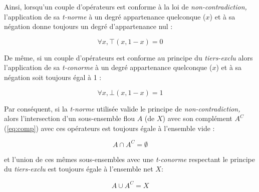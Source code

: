Ainsi, lorsqu'un couple d'opérateurs est conforme à la loi de
\emph{non-contradiction,} l’application de sa \emph{t-norme} à un
degré appartenance quelconque (\(x\)) et à sa négation donne toujours
un degré d'appartenance nul :

\begin{equation}
  \forall x, ⊤(x,1-x) = 0
\end{equation}

De même, si un couple d'opérateurs est conforme au principe du
\emph{tiers-exclu} alors l’application de sa \emph{t-conorme} à un
degré appartenance quelconque (\(x\))  et à sa négation soit
toujours égal à 1 :

\begin{equation}
  \forall x, ⊥(x,1-x) = 1
\end{equation}

Par conséquent, si la \emph{t-norme} utilisée valide le principe de
\emph{non-contradiction,} alors l'intersection d'un sous-ensemble flou
\(A\) (de \(X\)) avec son complément \(A^C\) (\autoref{eq:comp}) avec
ces opérateurs est toujours égale à l'ensemble vide :

\begin{equation}
  A \cap A^C = \emptyset
\end{equation}

et l'union de ces mêmes sous-ensembles avec une \emph{t-conorme}
respectant le principe du \emph{tiers-exclu} est toujours égale à
l'ensemble net \(X\):

\begin{equation}
  A \cup A^C = X
\end{equation}

